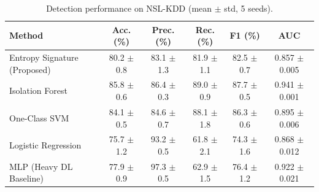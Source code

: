 \begin{table}[t]
\centering
\caption{Detection performance on NSL-KDD (mean $\pm$ std, 5 seeds).}
\label{tab:kdd}
\begin{tabular}{lccccc}
\toprule
Method & Acc. (\%) & Prec. (\%) & Rec. (\%) & F1 (\%) & AUC \\
\midrule
Entropy Signature (Proposed) & 80.2 $\pm$ 0.8 & 83.1 $\pm$ 1.3 & 81.9 $\pm$ 1.1 & 82.5 $\pm$ 0.7 & 0.857 $\pm$ 0.005 \\
Isolation Forest & 85.8 $\pm$ 0.6 & 86.4 $\pm$ 0.3 & 89.0 $\pm$ 0.9 & 87.7 $\pm$ 0.5 & 0.941 $\pm$ 0.001 \\
One-Class SVM & 84.1 $\pm$ 0.5 & 84.6 $\pm$ 0.7 & 88.1 $\pm$ 1.8 & 86.3 $\pm$ 0.6 & 0.895 $\pm$ 0.006 \\
Logistic Regression & 75.7 $\pm$ 1.2 & 93.2 $\pm$ 0.5 & 61.8 $\pm$ 2.1 & 74.3 $\pm$ 1.6 & 0.868 $\pm$ 0.012 \\
MLP (Heavy DL Baseline) & 77.9 $\pm$ 0.9 & 97.3 $\pm$ 0.5 & 62.9 $\pm$ 1.5 & 76.4 $\pm$ 1.2 & 0.922 $\pm$ 0.021 \\
\bottomrule
\end{tabular}
\end{table}